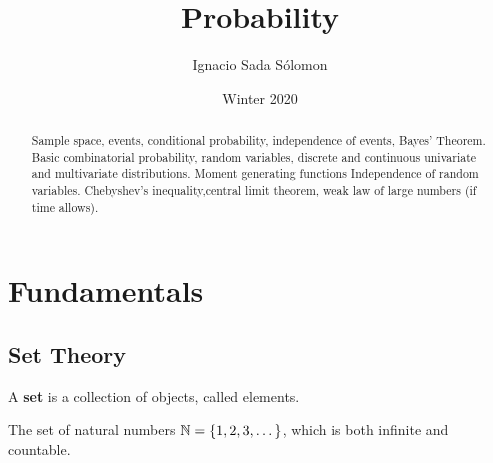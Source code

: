 \documentclass{article}
\title{Probability}
\author{Ignacio Sada S\'{o}lomon}
\date{Winter 2020}  %
\begin{document}
\clearpage\maketitle
\thispagestyle{empty}
\vspace{2cm}

\begin{abstract}
	Sample space, events, conditional probability, independence of events, Bayes' Theorem. Basic combinatorial probability, random variables, discrete and continuous univariate and multivariate distributions. Moment generating functions Independence of random variables. Chebyshev’s inequality,central limit theorem, weak law of large numbers (if time allows).
\end{abstract}

\newpage

\tableofcontents
\newpage
\setcounter{page}{1}
\cfoot{\thepage}

\section{Fundamentals}
\subsection{Set Theory}

	\begin{defn}
		A \textbf{set} is a collection of objects, called elements.
	\end{defn}
	\begin{exmp}
		The set of natural numbers $\mathbb{N} = \{ 1, 2, 3, \dots\}$, which is both infinite and countable.
	\end{exmp}
	\begin{exmp}
		
	\end{exmp}
\end{document}
